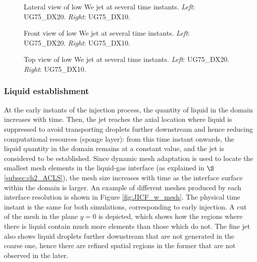\clearpage

\begin{figure}[ht]
\centering
{}
\caption[Lateral view of low We jet at several time instants. ]{Lateral view of low We jet at several time instants. \textsl{Left}: UG75\_DX20. \textsl{Right}: UG75\_DX10.}
\label{fig:JICF_establishment_UG75_lateral}
\end{figure}

\clearpage

\begin{figure}[ht]
\centering
{}
\caption[Front view of low We jet at several time instants. ]{Front view of low We jet at several time instants. \textsl{Left}: UG75\_DX20. \textsl{Right}: UG75\_DX10.}
\label{fig:JICF_establishment_UG75_front}
\end{figure}

\clearpage

\begin{figure}[ht]
\centering
{}
\caption[Top view of low We jet at several time instants. ]{Top view of low We jet at several time instants. \textsl{Left}: UG75\_DX20. \textsl{Right}: UG75\_DX10.}
\label{fig:JICF_establishment_UG75_top}
\end{figure}

\clearpage

\subsubsection*{Liquid establishment}

At the early instants of the injection process, the quantity of liquid in the domain increases with time. Then, the jet reaches the axial location where liquid is suppressed to avoid transporting droplets further downstream and hence reducing computational resources (sponge layer): from this time instant onwards, the liquid quantity in the domain remains at a constant value, and the jet is considered to be established. Since dynamic mesh adaptation is used to locate the smallest mesh elements in the liquid-gas interface (as explained in $\S$\ref{subsec:ch2_ACLS}), the mesh size increases with time as the interface surface within the domain is larger. An example of different meshes produced by each interface resolution is shown in Figure \ref{fig:JICF_w_mesh}. The physical time instant is the same for both simulations, corresponding to early injection. A cut of the mesh in the plane $y = 0$ is depicted, which shows how the regions where there is liquid contain much more elements than those which do not. The fine jet also shows liquid droplets further downstream that are not generated in the coarse one, hence there are refined spatial regions in the former that are not observed in the later.




